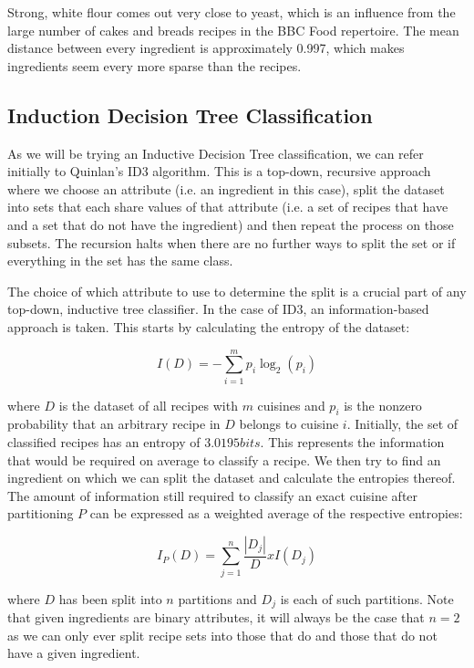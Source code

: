 \documentclass[11pt,a4paper]{article}
\begin{document}
Strong, white flour comes out very close to yeast, which is an influence from the large
number of cakes and breads recipes in the BBC Food repertoire. The mean distance
between every ingredient is approximately 0.997, which makes ingredients seem
every more sparse than the recipes.

\subsection{Induction Decision Tree Classification}
\label{sec:idt-classification}

As we will be trying an Inductive Decision Tree classification, we can refer
initially to Quinlan's ID3 algorithm. \cite{quinlan1986induction} This is a top-down,
recursive approach where we choose an attribute (i.e. an ingredient in this case),
split the dataset into sets that each share values of that attribute (i.e. a
set of recipes that have and a set that do not have the ingredient) and
then repeat the process on those subsets. The recursion halts when there are no
further ways to split the set or if everything in the set has the same class.

The choice of which attribute to use to determine the split is a crucial part of
any top-down, inductive tree classifier. In the case of ID3, an information-based
approach is taken. This starts by calculating the entropy \cite{reza1961introduction}
of the dataset:

\begin{equation}
  I(D)= - \sum_{i=1}^mp_i\log_2(p_i)
\end{equation}

\noindent where $D$ is the dataset of all recipes with $m$ cuisines
and $p_i$ is the nonzero probability
that an arbitrary recipe in $D$ belongs to cuisine $i$. Initially, the set of
classified recipes has an entropy of $3.0195 bits$. This represents the information
that would be required on average to classify a recipe. We then try to find
an ingredient on which we can split the dataset and calculate the entropies thereof.
The amount of information still required to classify an exact cuisine after
partitioning $P$ can be expressed as a weighted average of the respective
entropies:

\begin{equation}
  I_P(D) = \sum_{j=1}^n\frac{|D_j|}{D} x I(D_j)
\end{equation}

\noindent where $D$ has been split into $n$ partitions and $D_j$ is each of such
partitions. Note that given ingredients are binary attributes, it will
always be the case that $n = 2$ as we can only ever split recipe sets into
those that do and those that do not have a given ingredient.
\end{document}
